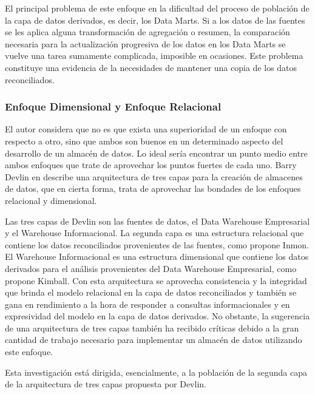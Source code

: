 El principal problema de este enfoque en la dificultad del proceso de poblaci\'on de la capa de datos derivados, es decir, los 
Data Marts. Si a  los datos de las fuentes se les aplica alguna transformaci\'on de agregaci\'on o resumen, la comparaci\'on 
necesaria para la actualización progresiva de los datos en los Data Marts se vuelve una tarea sumamente complicada, imposible en 
ocasiones. Este problema constituye una evidencia de la necesidades de mantener una copia de los datos reconciliados\cite{mijailmaster}.

\subsubsection{Enfoque Dimensional y Enfoque Relacional}

El autor considera que no es que exista una superioridad de un enfoque con respecto a otro, sino que ambos son buenos en 
un determinado aspecto del desarrollo de un almac\'en de datos. Lo ideal ser\'ia encontrar un punto medio entre ambos 
enfoques que trate de aprovechar los puntos fuertes de cada uno. Barry Devlin en \cite{devlin1996data} describe 
una arquitectura de tres capas para la creaci\'on de almacenes de datos, que en cierta forma, trata de aprovechar las 
bondades de los enfoques relacional y dimensional. 

Las tres capas de Devlin son las fuentes de datos, el Data Warehouse Empresarial y el Warehouse Informacional. La segunda capa 
es una estructura relacional que contiene los datos reconciliados provenientes de las fuentes, como propone Inmon. El Warehouse 
Informacional es una estructura dimensional que contiene los datos derivados para el an\'alisis provenientes del Data Warehouse 
Empresarial, como propone Kimball. Con esta arquitectura se aprovecha consistencia y la integridad que brinda el modelo relacional 
en la capa de datos reconciliados y tambi\'en se gana en rendimiento a la hora de responder a consultas informacionales y en expresividad 
del modelo en la capa de datos derivados. No obstante, la sugerencia de una arquitectura de tres capas también ha recibido críticas 
debido a la gran cantidad de trabajo necesario para implementar un almacén de datos utilizando este enfoque. 

Esta investigación est\'a dirigida, esencialmente, a la poblaci\'on de la segunda capa de la arquitectura de tres 
capas propuesta por Devlin.